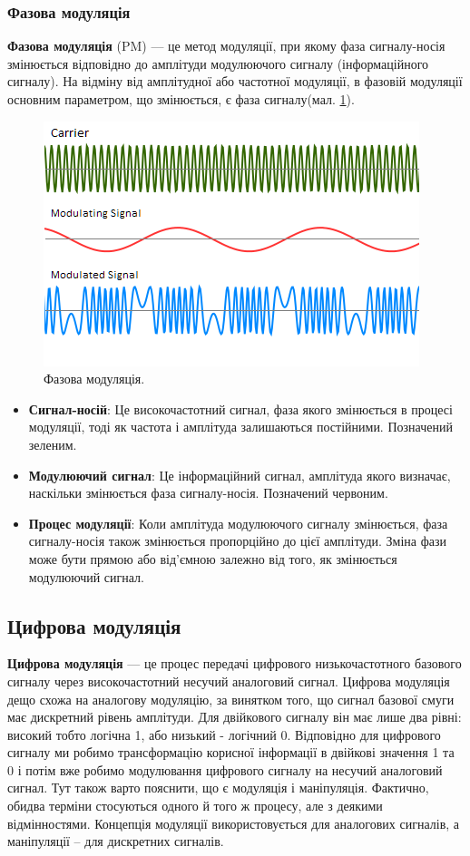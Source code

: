 \documentclass{article}
\begin{document}
\subsubsection{Фазова модуляція}

\textbf{Фазова модуляція} (PM) --- це метод модуляції, при якому фаза сигналу-носія змінюється відповідно до амплітуди модулюючого сигналу (інформаційного сигналу). На відміну від амплітудної або частотної модуляції, в фазовій модуляції основним параметром, що змінюється, є фаза сигналу(мал. \ref{fig:pm}).

\begin{figure}[h!]
\centering
\includegraphics[width=0.6\linewidth]{images/pm.png}
\caption{\label{fig:pm}Фазова модуляція.}
\end{figure}

\begin{itemize}[noitemsep, topsep=8pt]
\item \textbf{Сигнал-носій}: Це високочастотний сигнал, фаза якого змінюється в процесі модуляції, тоді як частота і амплітуда залишаються постійними. Позначений зеленим.
\item \textbf{Модулюючий сигнал}: Це інформаційний сигнал, амплітуда якого визначає, наскільки змінюється фаза сигналу-носія. Позначений червоним.
\item \textbf{Процес модуляції}: Коли амплітуда модулюючого сигналу змінюється, фаза сигналу-носія також змінюється пропорційно до цієї амплітуди. Зміна фази може бути прямою або від'ємною залежно від того, як змінюється модулюючий сигнал.
\end{itemize}

\subsection{Цифрова модуляція}
\textbf{Цифрова модуляція} --- це процес передачі цифрового низькочастотного базового сигналу через високочастотний несучий аналоговий сигнал. Цифрова модуляція дещо схожа на аналогову модуляцію, за винятком того, що сигнал базової смуги має дискретний рівень амплітуди. Для двійкового сигналу він має лише два рівні: високий тобто логічна 1, або низький - логічний 0. Відповідно для цифрового сигналу ми робимо трансформацію корисної інформації в двійкові значення 1 та 0 і потім вже робимо модулювання цифрового сигналу на несучий аналоговий сигнал. Тут також варто пояснити, що є модуляція і маніпуляція. Фактично, обидва терміни стосуються одного й того ж процесу, але з деякими відмінностями. Концепція модуляції використовується для аналогових сигналів, а маніпуляції – для дискретних сигналів.
\end{document}
